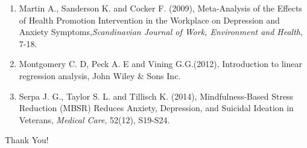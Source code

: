 \documentclass{beamer}
\newcounter{saveenumi}
\newcommand{\conti}{\setcounter{enumi}{\value{saveenumi}}}
\numberwithin{equation}{section}
\numberwithin{table}{section}
\begin{document}
\begin{frame}
	\begin{enumerate}
	\conti
\item Martin A., Sanderson K. and Cocker F. (2009), Meta-Analysis of the Effects of Health Promotion Intervention in the Workplace on Depression and Anxiety Symptoms,\emph{Scandinavian Journal of Work, Environment and Health}, 7-18.
\item  Montgomery C. D, Peck A. E and Vining G.G.(2012), Introduction to linear regression analysis, John Wiley \& Sons Inc.
\item Serpa J. G., Taylor S. L. and Tillisch K. (2014), Mindfulness-Based Stress Reduction (MBSR) Reduces Anxiety, Depression, and Suicidal Ideation in Veterans, \emph{Medical Care}, 52(12), S19-S24.
	\end{enumerate}
\end{frame}
\begin{frame}
	\begin{center}
		{\fontsize{40}{50}\selectfont Thank You!}
	\end{center}
\end{frame}
\end{document}
